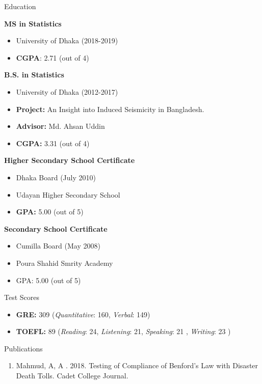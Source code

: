 \documentclass[
]{book}
\providecommand{\tightlist}{%
  \setlength{\itemsep}{0pt}\setlength{\parskip}{0pt}}
\begin{document}
Education

\textbf{MS in Statistics}

\begin{itemize}
\tightlist
\item
  University of Dhaka (2018-2019)
\item
  \textbf{CGPA}: 2.71 (out of 4)
\end{itemize}

\textbf{B.S. in Statistics}

\begin{itemize}
\tightlist
\item
  University of Dhaka (2012-2017)
\item
  \textbf{Project:} An Insight into Induced Seismicity in Bangladesh.
\item
  \textbf{Advisor:} Md. Ahsan Uddin
\item
  \textbf{CGPA:} 3.31 (out of 4)
\end{itemize}

\textbf{Higher Secondary School Certificate}

\begin{itemize}
\tightlist
\item
  Dhaka Board (July 2010)
\item
  Udayan Higher Secondary School
\item
  \textbf{GPA:} 5.00 (out of 5)
\end{itemize}

\textbf{Secondary School Certificate}

\begin{itemize}
\tightlist
\item
  Cumilla Board (May 2008)
\item
  Poura Shahid Smrity Academy
\item
  GPA: 5.00 (out of 5)
\end{itemize}

Test Scores

\begin{itemize}
\tightlist
\item
  \textbf{GRE:} 309 (\emph{Quantitative}: 160, \emph{Verbal}: 149)
\item
  \textbf{TOEFL:} 89 (\emph{Reading}: 24, \emph{Listening}: 21, \emph{Speaking}: 21 , \emph{Writing}: 23 )
\end{itemize}

Publications

\begin{enumerate}
\def\labelenumi{\arabic{enumi}.}
\tightlist
\item
  Mahmud, A, A . 2018. Testing of Compliance of Benford's Law with Disaster
  Death Tolls. Cadet College Journal.
\end{enumerate}
\end{document}
